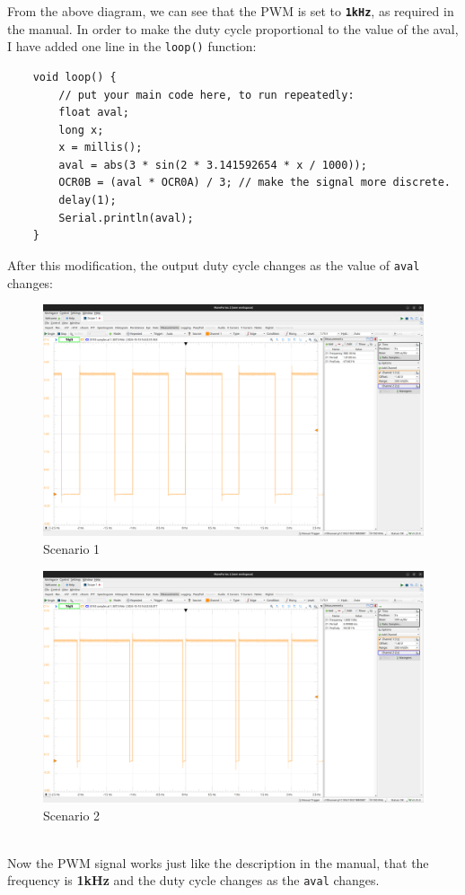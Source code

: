 \documentclass{report}
\begin{document}
   From the above diagram, we can see that the PWM is set to \textbf{\texttt{1kHz}}, as required in the manual. In order to make the duty cycle proportional to the value of the aval, I have added one line in the \texttt{loop()} function:
   \begin{verbatim}
    void loop() {
        // put your main code here, to run repeatedly:
        float aval;
        long x;
        x = millis();
        aval = abs(3 * sin(2 * 3.141592654 * x / 1000));
        OCR0B = (aval * OCR0A) / 3; // make the signal more discrete. 
        delay(1);
        Serial.println(aval);
    }
   \end{verbatim}
   After this modification, the output duty cycle changes as the value of \texttt{aval} changes:\\
   \begin{minipage}{0.49\textwidth}
    \begin{figure}[H]
    \includegraphics[width=\textwidth]{scope2.png}
    \caption{Scenario 1}
    \end{figure}
    \end{minipage}
    \hfill
    \begin{minipage}{0.49\textwidth}
        \begin{figure}[H]
        \includegraphics[width=\textwidth]{scope3.png}
        \caption{Scenario 2}
        \end{figure}
    \end{minipage}\\[0.5em]
    Now the PWM signal works just like the description in the manual, that the frequency is \textbf{1kHz} and the duty cycle changes as the \texttt{aval} changes. \\
\end{document}
